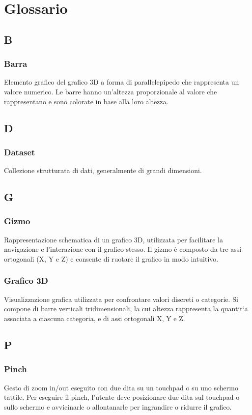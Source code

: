 \section{Glossario}
\label{glossario}
\subsection{B}
\subsubsection{Barra}
Elemento grafico del grafico 3D a forma di parallelepipedo che rappresenta un
valore numerico. Le barre hanno un'altezza proporzionale al valore che
rappresentano e sono colorate in base alla loro altezza.

\subsection{D}
\subsubsection{Dataset}
Collezione strutturata di dati, generalmente di grandi dimensioni.

\subsection{G}
\subsubsection{Gizmo}
Rappresentazione schematica di un grafico 3D, utilizzata per facilitare la
navigazione e l'interazione con il grafico stesso. Il gizmo è composto da tre
assi ortogonali (X, Y e Z) e consente di ruotare il grafico in modo intuitivo.
\subsubsection{Grafico 3D}
Visualizzazione grafica utilizzata per confrontare valori discreti o categorie.
Si compone di barre verticali tridimensionali, la cui altezza rappresenta la
quantit`a associata a ciascuna categoria, e di assi ortogonali X, Y e Z.

\subsection{P}
\subsubsection{Pinch}
Gesto di zoom in/out eseguito con due dita su un touchpad o su uno schermo
tattile. Per eseguire il pinch, l'utente deve posizionare due dita sul touchpad
o sullo schermo e avvicinarle o allontanarle per ingrandire o ridurre il
grafico.

